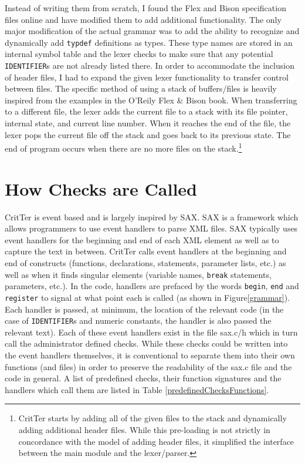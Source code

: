\documentclass[12pt]{report}
\def\lstlistingname{Figure}
\newcommand{\refCode}{\lstlistingname \hspace{1mm}}
\newcommand{\programName}{CritTer\xspace}
\begin{document}
Instead of writing them from scratch, I found the Flex and Bison specification files 
online\cite{originalGrammar} and have modified them to add additional functionality. The only major 
modification of the actual grammar was to add the ability to recognize and dynamically add 
\lstinline{typdef} definitions as types. These type names are stored in an internal symbol table and the 
lexer checks to make sure that any potential \lstinline{IDENTIFIER}s are not already listed there. In 
order to accommodate the inclusion of header files, I had to expand the given lexer functionality to 
transfer control between files. The specific method of using a stack of buffers/files is heavily inspired 
from the examples in the O'Reily Flex \& Bison book\cite{flex-and-bison}. When transferring to a 
different file, the lexer adds the current file to a stack with its file pointer, internal state, and current line 
number. When it reaches the end of the file, the lexer pops the current file off the stack and goes back 
to its previous state. The end of program occurs when there are no more files on the 
stack.\footnote{\programName starts by adding all of the given files to the stack and dynamically adding 
additional header files. While this pre-loading is not strictly in concordance with the model of adding 
header files, it simplified the interface between the main module and the lexer/parser.} 


\section{How Checks are Called}
\label{howChecksAreCalled}

\programName is event based and is largely inspired by SAX\cite{saxHomepage}. SAX is a 
framework which allows programmers to use event handlers to parse XML files. SAX typically uses
event handlers for the beginning and end of each XML element as well as to capture the text in 
between. \programName calls event handlers at the beginning and end of constructs (functions, 
declarations, statements, parameter lists, etc.) as well as when it finds singular elements (variable 
names, \lstinline{break} statements, parameters, etc.). In the code, handlers are prefaced by the words 
\lstinline{begin}, \lstinline{end} and \lstinline{register} to signal at what point each is called (as shown 
in \refCode \ref{grammar}). Each handler is passed, at minimum, the location of the relevant code (in 
the case of \lstinline{IDENTIFIER}s and numeric constants, the handler is also passed the relevant 
text). Each of these event handlers exist in the file sax.c/h which in turn call the administrator defined 
checks. While these checks could be written into the event handlers themselves, it is conventional to 
separate them into their own functions (and files) in order to preserve the readability of the sax.c file 
and the code in general. A list of predefined checks, their function signatures and the handlers which 
call them are listed in Table \ref{predefinedChecksFunctions}.
\end{document}
